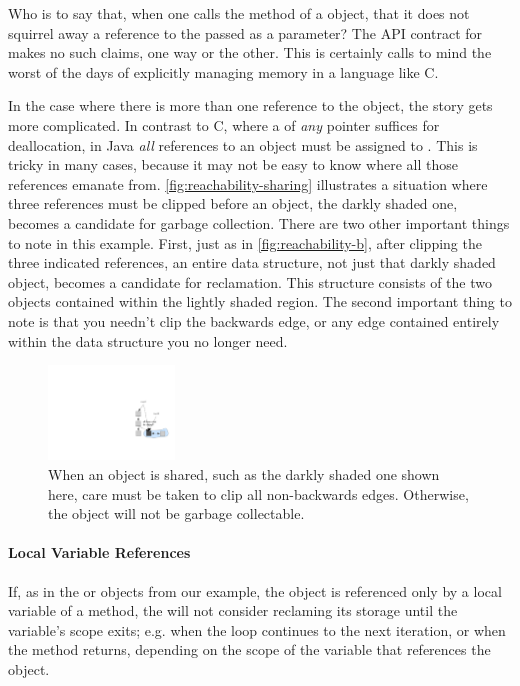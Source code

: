 Who is to say that, when one calls the  method of a
 object, that it does not squirrel away a reference to
the  passed as a parameter? The API contract for
 makes no such claims, one way or the other. This is certainly calls
to mind the worst of the days of explicitly managing memory in a language like C.

In the case where there is more than one reference to the object, the story gets
more complicated. In contrast to C, where a  of \emph{any} pointer
suffices for deallocation, in Java \emph{all} references to an object must be
assigned to . This is tricky in many cases, because it may not be easy
to know where all those references emanate from.
\autoref{fig:reachability-sharing} illustrates a situation where three references
must be clipped before an object, the darkly shaded one, becomes a candidate for
garbage collection. There are two other important things to note in this example.
First, just as in \autoref{fig:reachability-b}, after clipping the three
indicated references, an entire data structure, not just that darkly shaded
object, becomes a candidate for reclamation.
 This structure consists of the two objects contained within the lightly shaded
 region. The second important thing to note is that you needn't clip the
 backwards edge, or any edge contained entirely within the data structure you no
 longer need.

\begin{figure}
\centering
	\includegraphics[width=0.3\textwidth]{part4/Figures/lifetime/reachability3}
	\caption{When an object is shared, such as the darkly shaded one shown
	here, care must be taken to clip all non-backwards edges. Otherwise, the
	object will not be garbage collectable.}
	\label{fig:reachability-sharing}
\end{figure}



\paragraph{Local Variable References}

If, as in the 
or  objects from our example, the object is referenced
only by a local variable of a method, the \jre will not consider reclaming its
storage until the variable's scope exits; e.g. when the loop continues to the
next iteration, or when the method returns, depending on the scope of the
variable that references the object. 

